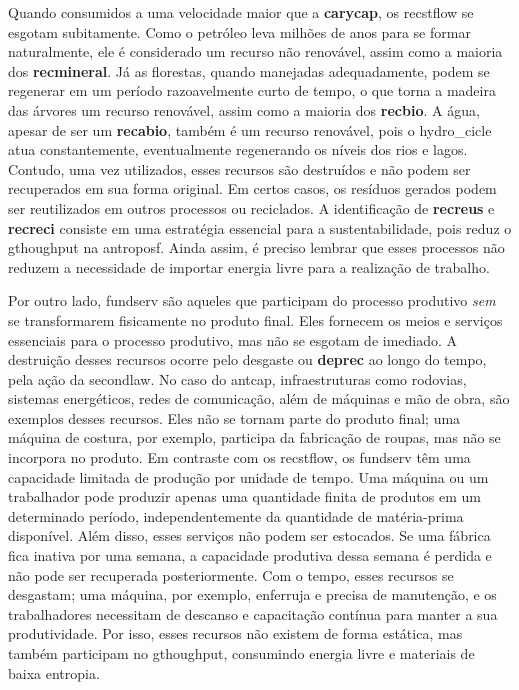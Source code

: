 \documentclass[./main.tex]{subfiles}
\begin{document}
\par Quando consumidos a uma velocidade maior que a \textbf{\gls{carycap}}, os \gls{recstflow} se esgotam subitamente. Como o petróleo leva milhões de anos para se formar naturalmente, ele é considerado um recurso não renovável, assim como a maioria dos \textbf{\gls{recmineral}}. Já as florestas, quando manejadas adequadamente, podem se regenerar em um período razoavelmente curto de tempo, o que torna a madeira das árvores um recurso renovável, assim como a maioria dos \textbf{\gls{recbio}}. A água, apesar de ser um \textbf{\gls{recabio}}, também é um recurso renovável, pois o \gls{hydro_cicle} atua constantemente, eventualmente regenerando os níveis dos rios e lagos.  Contudo, uma vez utilizados, esses recursos são destruídos e não podem ser recuperados em sua forma original. Em certos casos, os resíduos gerados podem ser reutilizados em outros processos ou reciclados. A identificação de \textbf{\gls{recreus}} e \textbf{\gls{recreci}} consiste em uma estratégia essencial para a sustentabilidade, pois reduz o \gls{gthoughput} na \gls{antroposf}. Ainda assim, é preciso lembrar que esses processos não reduzem a necessidade de importar energia livre para a realização de trabalho.

\par Por outro lado, \gls{fundserv} são aqueles que participam do processo produtivo \textit{sem} se transformarem fisicamente no produto final. Eles fornecem os meios e serviços essenciais para o processo produtivo, mas não se esgotam de imediado. A destruição desses recursos ocorre pelo desgaste ou \textbf{\gls{deprec}} ao longo do tempo, pela ação da \gls{secondlaw}. No caso do \gls{antcap}, infraestruturas como rodovias, sistemas energéticos, redes de comunicação, além de máquinas e mão de obra, são exemplos desses recursos. Eles não se tornam parte do produto final; uma máquina de costura, por exemplo, participa da fabricação de roupas, mas não se incorpora no produto. Em contraste com os \gls{recstflow}, os \gls{fundserv} têm uma capacidade limitada de produção por unidade de tempo. Uma máquina ou um trabalhador pode produzir apenas uma quantidade finita de produtos em um determinado período, independentemente da quantidade de matéria-prima disponível. Além disso, esses serviços não podem ser estocados. Se uma fábrica fica inativa por uma semana, a capacidade produtiva dessa semana é perdida e não pode ser recuperada posteriormente. Com o tempo, esses recursos se desgastam; uma máquina, por exemplo, enferruja e precisa de manutenção, e os trabalhadores necessitam de descanso e capacitação contínua para manter a sua produtividade. Por isso, esses recursos não existem de forma estática, mas também participam no \gls{gthoughput}, consumindo energia livre e materiais de baixa entropia.
\end{document}
